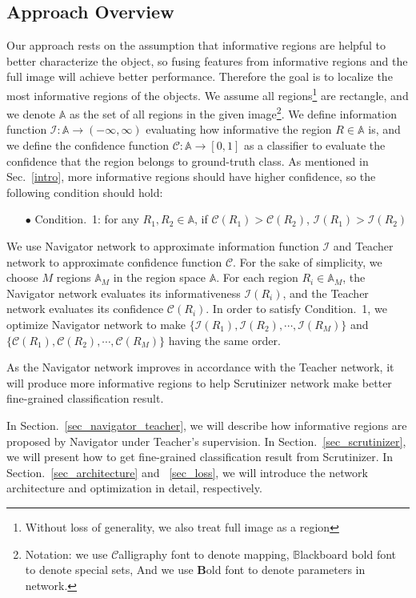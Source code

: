 \documentclass[runningheads]{llncs}
\begin{document}
\subsection{Approach Overview}
Our approach rests on the assumption that informative regions are helpful to better characterize the object, so fusing features from informative regions and the full image will achieve better performance. Therefore the goal is to localize the most informative regions of the objects. We assume all regions\footnote{Without loss of generality, we also treat full image as a region} are rectangle, and we denote $\mathbb A$ as the set of all regions in the given image\footnote{Notation: we use $\mathcal C$alligraphy font to denote mapping, $\mathbb B$lackboard bold font to denote special sets, And we use $\mathbf B$old font to denote parameters in network.}. We define information function $\mathcal I: \mathbb A \to (-\infty, \infty)$ evaluating how informative the region $R \in \mathbb A$ is, and we define the confidence function $\mathcal C: \mathbb A \to [0,1]$ as a classifier to evaluate the confidence that the region belongs to ground-truth class. As mentioned in Sec.~\ref{intro}, more informative regions should have higher confidence, so the following condition should hold:

\begin{itemize}
 	\item[$\bullet$] Condition.~1: for any $ R_1, R_2 \in \mathbb A$, if $\mathcal C(R_1) > \mathcal C(R_2)$, $\mathcal I(R_1) > \mathcal I(R_2)$
\end{itemize}

We use Navigator network to approximate information function $\mathcal I$ and Teacher network to approximate confidence function $\mathcal C$. For the sake of simplicity, we choose $M$ regions $\mathbb A_M$ in the region space $\mathbb A$. For each region $R_i \in \mathbb A_M$, the Navigator network evaluates its informativeness $\mathcal I(R_i)$, and the Teacher network evaluates its confidence
 $\mathcal C(R_i)$. In order to satisfy Condition.~1, we optimize Navigator network to make $\{\mathcal I(R_1), \mathcal I(R_2), \cdots, \mathcal I(R_M)\}$ and $\{\mathcal C(R_1), \mathcal C(R_2), \cdots, \mathcal C(R_M)\}$ having the same order. 

As the Navigator network improves in accordance with the Teacher network, it will produce more informative regions to help Scrutinizer network make better fine-grained classification result.

In Section.~\ref{sec_navigator_teacher}, we will describe how informative regions are proposed by Navigator under Teacher's supervision. In Section.~\ref{sec_scrutinizer},  we will present how to get fine-grained classification result from Scrutinizer. In Section.~\ref{sec_architecture} and ~\ref{sec_loss}, we will introduce the network architecture and optimization in detail, respectively.
\end{document}
